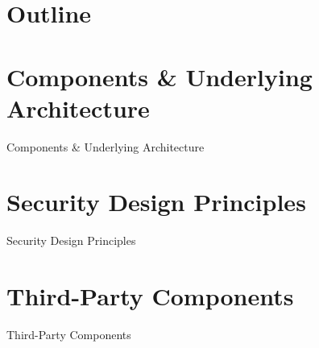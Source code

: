 \documentclass[accentcolor=tud8b,colorbacktitle,inverttitle,landscape,presentation,t]{tudbeamer}
\begin{document}
\section*{Outline}

\begin{frame}{\insertsubsection}
	\tableofcontents[sectionstyle=show,subsectionstyle=hide]
\end{frame}


\section{Components \& Underlying Architecture}

\begin{frame}{\insertsection}
	Components \& Underlying Architecture
\end{frame}


\section{Security Design Principles}

\begin{frame}{\insertsection}
	Security Design Principles
\end{frame}


\section{Third-Party Components}

\begin{frame}{\insertsection}
	Third-Party Components
\end{frame}
\end{document}
